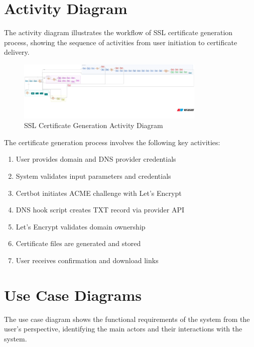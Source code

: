 \section{Activity Diagram}

The activity diagram illustrates the workflow of SSL certificate generation process, showing the sequence of activities from user initiation to certificate delivery.

\begin{figure}[h]
\centering
\includegraphics[width=0.8\textwidth]{diagram-images/3.2-activity-diagram.png}
\caption{SSL Certificate Generation Activity Diagram}
\label{fig:activity-diagram}
\end{figure}

The certificate generation process involves the following key activities:
\begin{enumerate}
    \item User provides domain and DNS provider credentials
    \item System validates input parameters and credentials
    \item Certbot initiates ACME challenge with Let's Encrypt
    \item DNS hook script creates TXT record via provider API
    \item Let's Encrypt validates domain ownership
    \item Certificate files are generated and stored
    \item User receives confirmation and download links
\end{enumerate}

\section{Use Case Diagrams}

The use case diagram shows the functional requirements of the system from the user's perspective, identifying the main actors and their interactions with the system.

